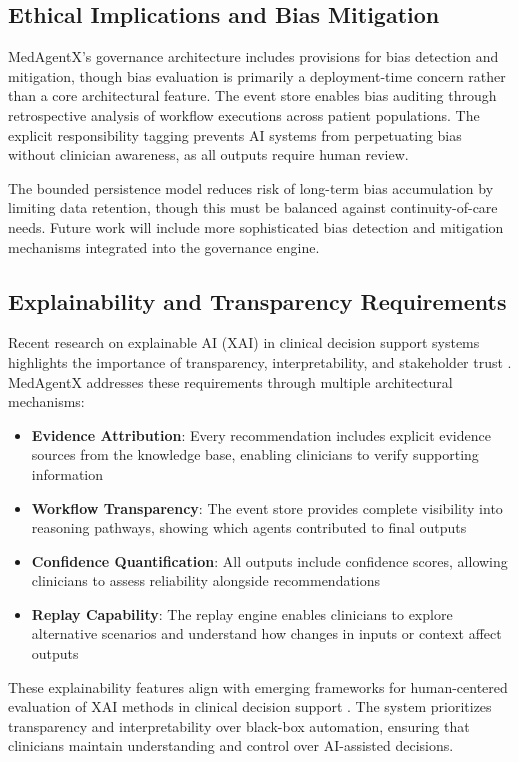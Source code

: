 \documentclass[journal]{IEEEtran}
\begin{document}
\subsection{Ethical Implications and Bias Mitigation}
MedAgentX's governance architecture includes provisions for bias detection and mitigation, though bias evaluation is primarily a deployment-time concern rather than a core architectural feature. The event store enables bias auditing through retrospective analysis of workflow executions across patient populations. The explicit responsibility tagging prevents AI systems from perpetuating bias without clinician awareness, as all outputs require human review.

The bounded persistence model reduces risk of long-term bias accumulation by limiting data retention, though this must be balanced against continuity-of-care needs. Future work will include more sophisticated bias detection and mitigation mechanisms integrated into the governance engine.

\subsection{Explainability and Transparency Requirements}
Recent research on explainable AI (XAI) in clinical decision support systems highlights the importance of transparency, interpretability, and stakeholder trust \cite{amann2020, xai_cdss_2024, xai_meta_2024}. MedAgentX addresses these requirements through multiple architectural mechanisms:

\begin{itemize}
    \item \textbf{Evidence Attribution}: Every recommendation includes explicit evidence sources from the knowledge base, enabling clinicians to verify supporting information
    \item \textbf{Workflow Transparency}: The event store provides complete visibility into reasoning pathways, showing which agents contributed to final outputs
    \item \textbf{Confidence Quantification}: All outputs include confidence scores, allowing clinicians to assess reliability alongside recommendations
    \item \textbf{Replay Capability}: The replay engine enables clinicians to explore alternative scenarios and understand how changes in inputs or context affect outputs
\end{itemize}

These explainability features align with emerging frameworks for human-centered evaluation of XAI methods in clinical decision support \cite{xai_human_centered_2025}. The system prioritizes transparency and interpretability over black-box automation, ensuring that clinicians maintain understanding and control over AI-assisted decisions.
\end{document}
